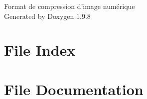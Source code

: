 \documentclass[twoside]{book}
\newcommand{\+}{\discretionary{\mbox{\scriptsize$\hookleftarrow$}}{}{}}
\newcommand{\clearemptydoublepage}{%
    \newpage{\pagestyle{empty}\cleardoublepage}%
  }
\begin{document}
  \raggedbottom
    \hypersetup{pageanchor=false,
                bookmarksnumbered=true,
                pdfencoding=unicode
               }
  \begin{titlepage}
  \vspace*{7cm}
  \begin{center}%
  {\Large Format de compression d’image numérique}\\
  \vspace*{1cm}
  {\large Generated by Doxygen 1.9.8}\\
  \end{center}
  \end{titlepage}
  \clearemptydoublepage
  \tableofcontents
  \clearemptydoublepage
  \hypersetup{pageanchor=true}
\chapter{File Index}

\chapter{File Documentation}



  \backmatter
  \newpage
  \clearemptydoublepage
  \printindex
\end{document}
